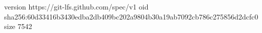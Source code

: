 version https://git-lfs.github.com/spec/v1
oid sha256:60d33416b3430edba2db409bc202a9804b30a19ab7092cb786c275856d2dcfc0
size 7542
